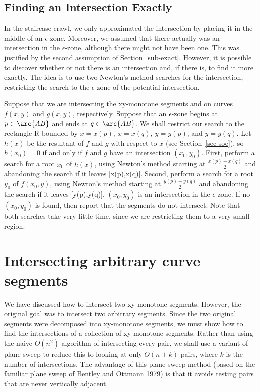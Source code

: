 \subsection{Finding an Intersection Exactly}
\label{sub-exact2}

In the staircase crawl, we only approximated the intersection by placing it in the middle
of an $\epsilon$-zone.
Moreover, we assumed that there actually was an intersection in the $\epsilon$-zone, although
there might not have been one.
This was justified by the second assumption of Section~\ref{sub-exact}.
However, it is possible to discover whether or not there is an intersection and, if there is,
to find it more exactly.
The idea is to use two Newton's method searches for the intersection, restricting the search
to the $\epsilon$-zone of the potential intersection.

Suppose that we are intersecting the xy-monotone segments  and  on curves
$f(x,y)$ and $g(x,y)$, respectively.
Suppose that an $\epsilon$-zone begins at $p \in \arc{AB}$ and ends at $q \in \arc{AB}$.
We shall restrict our search to the rectangle R bounded by $x = x(p),\ x = x(q),\ y = y(p)$,
and $y = y(q)$.
Let $h(x)$ be the resultant of $f$ and $g$ with respect to $x$ (see Section~\ref{sec-soe}),
so $h(x_{0}) = 0$ if and only if $f$ and $g$ have an intersection $(x_{0},y_{0})$.
First, perform a search for a root $x_{0}$ of $h(x)$, using Newton's method starting at
$\frac{x(p)+x(q)}{2}$ and abandoning the search if it leaves [x(p),x(q)].
Second, perform a search for a root $y_{0}$ of $f(x_{0},y)$, using Newton's method starting at
$\frac{y(p)+y(q)}{2}$ and abandoning the search if it leaves [y(p),y(q)].
$(x_{0},y_{0})$ is an intersection in the $\epsilon$-zone.
If no $(x_{0},y_{0})$ is found, then report that the segments do not intersect.
Note that both searches take very little time, since we are restricting them to a very
small region.

\section{Intersecting arbitrary curve segments}
\label{sec-sweep}

We have discussed how to intersect two xy-monotone segments.
However, the original goal was to intersect two arbitrary segments.
Since the two original segments were decomposed into xy-monotone segments, we must show
how to find the intersections of a collection of xy-monotone segments.
Rather than using the naive $O(n^{2})$ algorithm of intersecting every pair, 
we shall use a variant of plane sweep to reduce this to looking at only $O(n + k)$ pairs,
where $k$ is the number of intersections.
The advantage of this plane sweep method (based on the familiar plane sweep of Bentley 
and Ottmann 1979) is that it avoids testing pairs that are never vertically adjacent.

